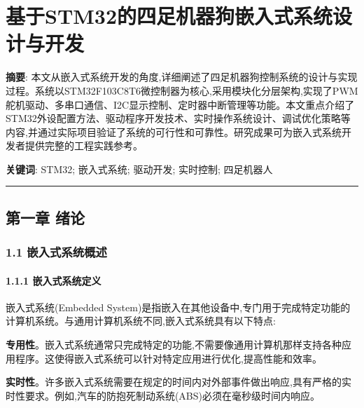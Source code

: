 \documentclass[
]{article}
\author{}
\date{}
\begin{document}
\hypertarget{ux57faux4e8estm32ux7684ux56dbux8db3ux673aux5668ux72d7ux5d4cux5165ux5f0fux7cfbux7edfux8bbeux8ba1ux4e0eux5f00ux53d1}{%
\section{基于STM32的四足机器狗嵌入式系统设计与开发}\label{ux57faux4e8estm32ux7684ux56dbux8db3ux673aux5668ux72d7ux5d4cux5165ux5f0fux7cfbux7edfux8bbeux8ba1ux4e0eux5f00ux53d1}}

\textbf{摘要}:
本文从嵌入式系统开发的角度,详细阐述了四足机器狗控制系统的设计与实现过程。系统以STM32F103C8T6微控制器为核心,采用模块化分层架构,实现了PWM舵机驱动、多串口通信、I2C显示控制、定时器中断管理等功能。本文重点介绍了STM32外设配置方法、驱动程序开发技术、实时操作系统设计、调试优化策略等内容,并通过实际项目验证了系统的可行性和可靠性。研究成果可为嵌入式系统开发者提供完整的工程实践参考。

\textbf{关键词}: STM32; 嵌入式系统; 驱动开发; 实时控制; 四足机器人

\begin{center}\rule{0.5\linewidth}{0.5pt}\end{center}

\hypertarget{ux7b2cux4e00ux7ae0-ux7eeaux8bba}{%
\subsection{第一章 绪论}\label{ux7b2cux4e00ux7ae0-ux7eeaux8bba}}

\hypertarget{ux5d4cux5165ux5f0fux7cfbux7edfux6982ux8ff0}{%
\subsubsection{1.1
嵌入式系统概述}\label{ux5d4cux5165ux5f0fux7cfbux7edfux6982ux8ff0}}

\hypertarget{ux5d4cux5165ux5f0fux7cfbux7edfux5b9aux4e49}{%
\paragraph{1.1.1
嵌入式系统定义}\label{ux5d4cux5165ux5f0fux7cfbux7edfux5b9aux4e49}}

嵌入式系统(Embedded
System)是指嵌入在其他设备中,专门用于完成特定功能的计算机系统。与通用计算机系统不同,嵌入式系统具有以下特点:

\textbf{专用性}。嵌入式系统通常只完成特定的功能,不需要像通用计算机那样支持各种应用程序。这使得嵌入式系统可以针对特定应用进行优化,提高性能和效率。

\textbf{实时性}。许多嵌入式系统需要在规定的时间内对外部事件做出响应,具有严格的实时性要求。例如,汽车的防抱死制动系统(ABS)必须在毫秒级时间内响应。
\end{document}
